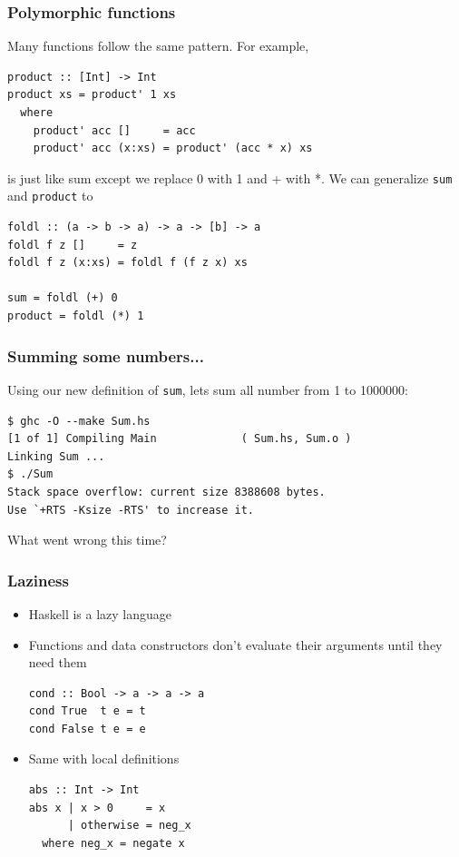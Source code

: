 \documentclass{beamer}
\begin{document}
\begin{frame}[fragile]
  \frametitle{Polymorphic functions}

  Many functions follow the same pattern. For example,
  \begin{lstlisting}
product :: [Int] -> Int
product xs = product' 1 xs
  where
    product' acc []     = acc
    product' acc (x:xs) = product' (acc * x) xs
  \end{lstlisting}

  is just like sum except we replace 0 with 1 and + with *. We can
  generalize \lstinline!sum! and \lstinline!product! to
  \begin{lstlisting}
foldl :: (a -> b -> a) -> a -> [b] -> a
foldl f z []     = z
foldl f z (x:xs) = foldl f (f z x) xs

sum = foldl (+) 0
product = foldl (*) 1
  \end{lstlisting}
\end{frame}

\begin{frame}[fragile]
  \frametitle{Summing some numbers...}  Using our new definition of
  \lstinline!sum!, lets sum all number from 1 to 1000000:

  \begin{verbatim}
$ ghc -O --make Sum.hs
[1 of 1] Compiling Main             ( Sum.hs, Sum.o )
Linking Sum ...
$ ./Sum
Stack space overflow: current size 8388608 bytes.
Use `+RTS -Ksize -RTS' to increase it.
  \end{verbatim}

  What went wrong this time?
\end{frame}


\begin{frame}[fragile]
  \frametitle{Laziness}

  \begin{itemize}
  \item Haskell is a lazy language
  \item Functions and data constructors don't evaluate their arguments
    until they need them
    \begin{lstlisting}
cond :: Bool -> a -> a -> a
cond True  t e = t
cond False t e = e
    \end{lstlisting}
  \item Same with local definitions
    \begin{lstlisting}
abs :: Int -> Int
abs x | x > 0     = x
      | otherwise = neg_x
  where neg_x = negate x
    \end{lstlisting}
  \end{itemize}
\end{frame}
\end{document}
